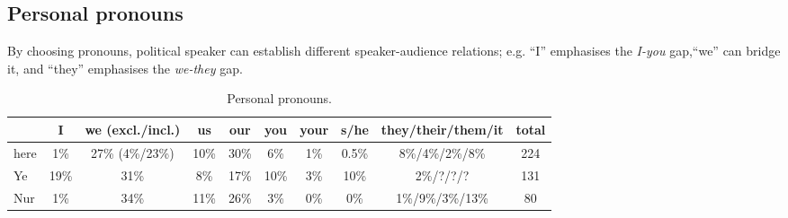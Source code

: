 \documentclass[11pt]{article}
\begin{document}
{	%
	\subsection{Personal pronouns}{
		By choosing pronouns, political speaker can establish different speaker-audience relations; e.g. ``I'' emphasises the \textit{I-you} gap,``we'' can bridge it, and ``they'' emphasises the \textit{we-they} gap.

		\begin{table}[h!tb]
	      \centering
	        \begin{tabular}{l|ccccccccc}
	                & I    & we (excl./incl.) & us   & our  & you  & your & s/he  & they/their/them/it & total \\
	          \hline
	          \hline
	          here  & 1\%  & 27\% (4\%/23\%)  & 10\% & 30\% & 6\%  & 1\%  & 0.5\% & 8\%/4\%/2\%/8\%    & 224 \\
	          \hline
	          Ye    & 19\% & 31\%             & 8\%  & 17\% & 10\% & 3\%  & 10\%  & 2\%/?/?/?          & 131 \\
	          Nur   & 1\%  & 34\%             & 11\% & 26\% & 3\%  & 0\%  & 0\%   & 1\%/9\%/3\%/13\%   & 80 \\
	        \end{tabular}
	      \caption{Personal pronouns.}
	      \label{tab:pronouns}
	    \end{table}

}}
\end{document}

